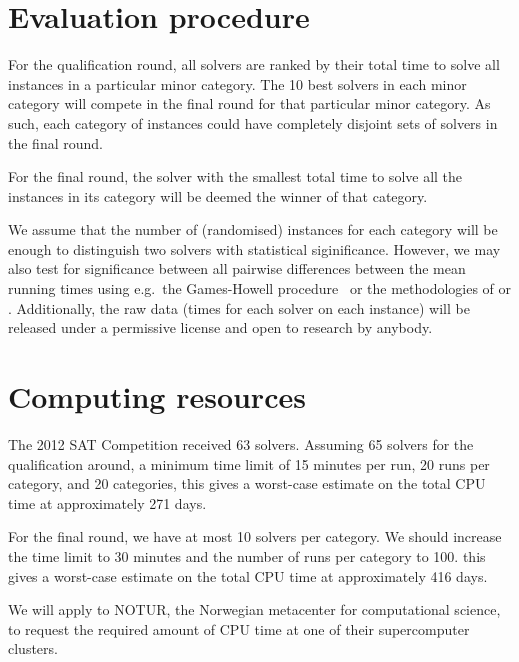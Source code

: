 \documentclass[12pt, a4paper]{article}
\begin{document}
\section{Evaluation procedure}




For the qualification round, all solvers are ranked by their total time to solve all instances in a particular minor category. The 10 best solvers in each minor category will compete in the final round for that particular minor category. As such, each category of instances could have completely disjoint sets of solvers in the final round.

For the final round, the solver with the smallest total time to solve all the instances in its category will be deemed the winner of that category.

We assume that the number of (randomised) instances for each category will be enough to distinguish two solvers with statistical siginificance. However, we may also test for significance between all pairwise differences between the mean running times using e.g.\ the Games-Howell procedure~\cite{Games1979} or the methodologies of \cite{Nikolic2010} or \cite{Gelder2011}. Additionally, the raw data (times for each solver on each instance) will be released under a permissive license and open to research by anybody.

\section{Computing resources}

The 2012 SAT Competition received 63 solvers. Assuming 65 solvers for the qualification around, a minimum time limit of 15 minutes per run, 20 runs per category, and 20 categories, this gives a worst-case estimate on the total CPU time at approximately 271 days.

For the final round, we have at most 10 solvers per category. We should increase the time limit to 30 minutes and the number of runs per category to 100. this gives a worst-case estimate on the total CPU time at approximately 416 days.

We will apply to NOTUR, the Norwegian metacenter for computational science, to request the required amount of CPU time at one of their supercomputer clusters.


\end{document}

